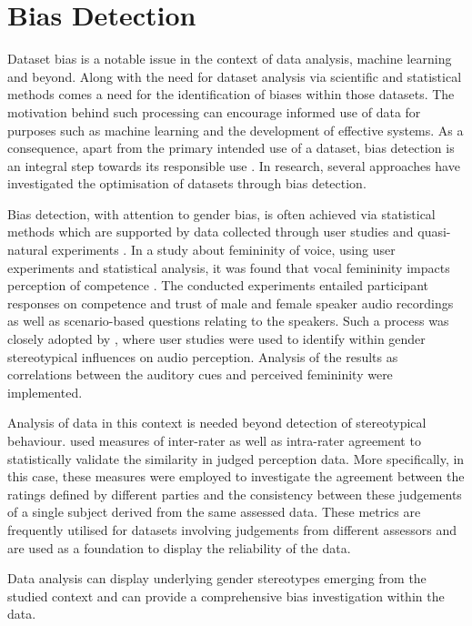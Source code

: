 \documentclass{l4proj}
\begin{document}
\section{Bias Detection}
\label{sec:Bias_detection}
Dataset bias is a notable issue in the context of data analysis, machine learning and beyond. 
Along with the need for dataset analysis via scientific and statistical methods comes a need for the identification of biases within those datasets. The motivation behind such processing can encourage informed use of data for purposes such as machine learning and the development of effective systems. As a consequence, apart from the primary intended use of a dataset, bias detection is an integral step towards its responsible use \citep{Ricart2022}.
In research, several approaches have investigated the optimisation of datasets through bias detection. 

Bias detection, with attention to gender bias, is often achieved via statistical methods which are supported by data collected through user studies and quasi-natural experiments \citep{Ko2006,Ko2009}. 
In a study about femininity of voice, using user experiments and statistical analysis, it was found that vocal femininity impacts perception of competence \citep{Ko2009}. The conducted experiments entailed participant responses on competence and trust of male and female speaker audio recordings as well as scenario-based questions relating to the speakers. 
Such a process was closely adopted by \citet{Dennhag2019}, where user studies were used to identify within gender stereotypical influences on audio perception. Analysis of the results as correlations between the auditory cues and perceived femininity were implemented.

Analysis of data in this context is needed beyond detection of stereotypical behaviour. \citet{Mileva2023} used measures of inter-rater as well as intra-rater agreement to statistically validate the similarity in judged perception data. More specifically, in this case, these measures were employed to investigate the agreement between the ratings defined by different parties and the consistency between these judgements of a single subject derived from the same assessed data. These metrics are frequently utilised for datasets involving judgements from different assessors and are used as a foundation to display the reliability of the data.

Data analysis can display underlying gender stereotypes emerging from the studied context and can provide a comprehensive bias investigation within the data.
\end{document}
